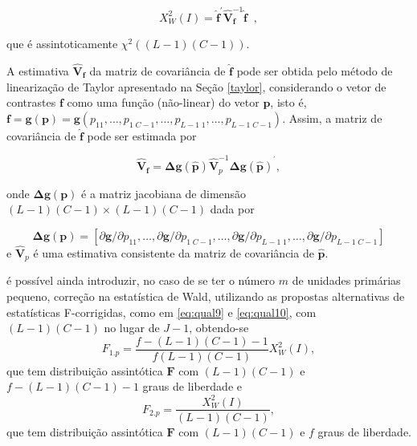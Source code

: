\documentclass[]{book}
\theoremstyle{definition}
\theoremstyle{definition}
\theoremstyle{definition}
\theoremstyle{remark}
\begin{document}
\begin{equation}
X_{W}^{2}\left( I\right) =\mathbf{\hat{f}}^{\prime }\mathbf{\hat{V}}_{
\mathbf{f}}^{-1}\mathbf{\hat{f}\;\;},  \label{eq:Tab10}
\end{equation}

que é assintoticamente
\(\chi ^{2}\left( \left( L-1\right) \left( C-1\right) \right)\).

A estimativa \(\mathbf{\hat{V}}_{\mathbf{f}}\) da matriz de covariância
de \(\mathbf{\hat{f}}\) pode ser obtida pelo método de linearização de
Taylor apresentado na Seção \ref{taylor}, considerando o vetor de
contrastes \(\mathbf{f}\) como uma função (não-linear) do vetor
\(\mathbf{p}\), isto é,
\(\mathbf{f=g}\left( \mathbf{p}\right) \mathbf{=g}\left( p_{11},\ldots ,p_{1\;C-1},\ldots ,p_{L-1\;1},\ldots,p_{L-1\;C-1}\right)\).
Assim, a matriz de covariância de \(\mathbf{\hat{f}}\) pode ser estimada
por

\begin{equation}
\mathbf{\hat{V}}_{\mathbf{f}}=\mathbf{\Delta g}\left( \mathbf{\hat{p}}
\right) \mathbf{\hat{V}}_{p}^{-1}\mathbf{\Delta g}\left( \mathbf{\hat{p}}
\right) ^{^{\prime }},  \label{eq:Tab11}
\end{equation}

onde \(\mathbf{\Delta g}\left( \mathbf{p}\right)\) é a matriz jacobiana
de dimensão
\(\left(L-1\right)\left( C-1\right)\times\left( L-1\right)\left( C-1\right)\)
dada por

\[
\mathbf{\Delta g}\left( \mathbf{p}\right) =\left[ \partial \mathbf{g}
/\partial p_{11},\ldots ,\partial \mathbf{g}/\partial p_{1\;C-1},\ldots
,\partial \mathbf{g}/\partial p_{L-1\;1},\ldots ,\partial \mathbf{g}
/\partial p_{L-1\;C-1}\right] 
\] e \(\mathbf{\hat{V}}_{p}\) é uma estimativa consistente da matriz de
covariância de \(\mathbf{\hat{p}}\).

é possível ainda introduzir, no caso de se ter o número \(m\) de
unidades primárias pequeno, correção na estatística de Wald, utilizando
as propostas alternativas de estatísticas F-corrigidas, como em
\eqref{eq:qual9} e \eqref{eq:qual10}, com
\(\left( L-1\right) \left( C-1\right)\) no lugar de \(J-1\), obtendo-se
\[
F_{1.p}=\frac{f-\left( L-1\right) \left( C-1\right) -1}{f\left( L-1\right)
\left( C-1\right) }X_{W}^{2}\left( I\right),
\] que tem distribuição assintótica \(\mathbf{F}\) com
\(\left(L-1\right) \left( C-1\right)\) e
\(f-\left( L-1\right) \left(C-1\right) -1\) graus de liberdade e \[
F_{2.p}=\frac{X_{W}^{2}\left( I\right) }{\left( L-1\right) \left( C-1\right) 
}, 
\] que tem distribuição assintótica \(\mathbf{F}\) com
\(\left(L-1\right) \left( C-1\right)\) e \(f\) graus de liberdade.
\end{document}
